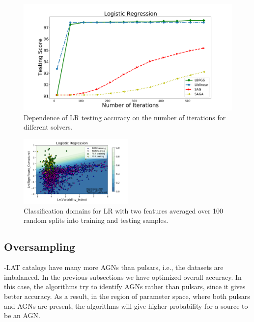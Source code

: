 \begin{figure}[h]
\includegraphics[width=\twopicsp\textwidth]{plots/lr_train_assocnewfeat.pdf}
\caption{Dependence of LR testing accuracy on the number of iterations for different solvers.}
\label{fig:LR_accuracy}
\end{figure}



\begin{figure}[h]

\includegraphics[width=0.5\textwidth]{plots/classification_domains/lr_200_lbfgs.pdf}
\caption{Classification domains for LR with two features 
averaged over 100 random splits into training and testing samples.}
\label{fig:LR_domains}
\end{figure}


\subsection{Oversampling}

\Fermi-LAT catalogs have many more AGNs than pulsars, i.e., the datasets are imbalanced.
In the previous subsections we have optimized overall accuracy. In this case, the algorithms try to identify AGNs rather than pulsars,
since it gives better accuracy. As a result, in the region of parameter space, where both pulsars and AGNs are present, the algorithms
will give higher probability for a source to be an AGN.


